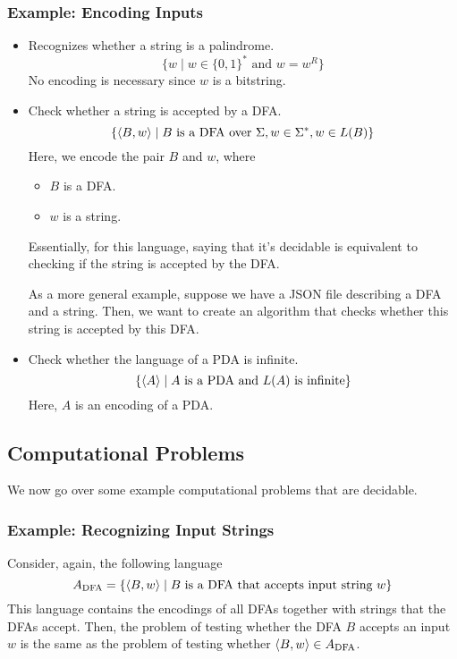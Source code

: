 \documentclass[letterpaper]{article}
\begin{document}
\subsubsection{Example: Encoding Inputs}
\begin{itemize}
    \item Recognizes whether a string is a palindrome. 
    \[\{w \mid w \in \{0, 1\}^* \text{ and } w = w^R\}\]
    No encoding is necessary since $w$ is a bitstring. 

    \item Check whether a string is accepted by a DFA. 
    \[\{\langle B, w \rangle \mid B \text{ is a DFA over } \Sigma, w \in \Sigma^*, w \in L(B)\}\]
    Here, we encode the pair $B$ and $w$, where 
    \begin{itemize}
        \item $B$ is a DFA. 
        \item $w$ is a string. 
    \end{itemize}
    Essentially, for this language, saying that it's decidable is equivalent to checking if the string is accepted by the DFA. 

    \bigskip 

    As a more general example, suppose we have a JSON file describing a DFA and a string. Then, we want to create an algorithm that checks whether this string is accepted by this DFA. 

    \item Check whether the language of a PDA is infinite.
    \[\{\langle A \rangle \mid A \text{ is a PDA and } L(A) \text{ is infinite}\}\]
    Here, $A$ is an encoding of a PDA. 
\end{itemize}

\subsection{Computational Problems}
We now go over some example computational problems that are decidable.

\subsubsection{Example: Recognizing Input Strings}
Consider, again, the following language 
\[A_{\text{DFA}} = \{\langle B, w \rangle \mid B \text{ is a DFA that accepts input string } w\}\]
This language contains the encodings of all DFAs together with strings that the DFAs accept. Then, the problem of testing whether the DFA $B$ accepts an input $w$ is the same as the problem of testing whether $\langle B, w \rangle \in A_{\text{DFA}}$. 
\end{document}

